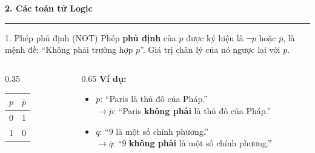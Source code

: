 \documentclass[aspectratio=169, 11pt]{beamer}
\begin{document}
\begin{frame}[plain]
  \centering
  \vspace*{2.2cm}
  {\Huge\textbf{\color{uitblue}2. Các toán tử Logic}}
  \par\vspace{0.4cm}
  {\color{uitblue}\rule{0.55\textwidth}{1.2pt}}
\end{frame}

\begin{frame}{1. Phép phủ định (NOT)}
Phép \textbf{phủ định} của $p$ được ký hiệu là $\neg p$ hoặc $\bar{p}$, là mệnh đề: ``Không phải trường hợp $p$''. Giá trị chân lý của nó ngược lại với $p$.

\vspace{0.4cm}
\begin{columns}[c, onlytextwidth]
  \begin{column}{0.35\textwidth}
    \centering
    \begin{tabular}{|c|c|}
    \hline
    $p$ & $\bar{p}$ \\
    \hline
    0 & 1 \\
    1 & 0 \\
    \hline
    \end{tabular}
  \end{column}
  \begin{column}{0.65\textwidth}
    \textbf{Ví dụ:}
    \begin{itemize}
      \item $p$: ``Paris là thủ đô của Pháp.''\\
            $\to \bar{p}$: ``Paris \textbf{không phải} là thủ đô của Pháp.''
      \item $q$: ``$9$ là một số chính phương.''\\
            $\to \bar{q}$: ``$9$ \textbf{không phải} là một số chính phương.''
    \end{itemize}
  \end{column}
\end{columns}
\end{frame}
\end{document}
